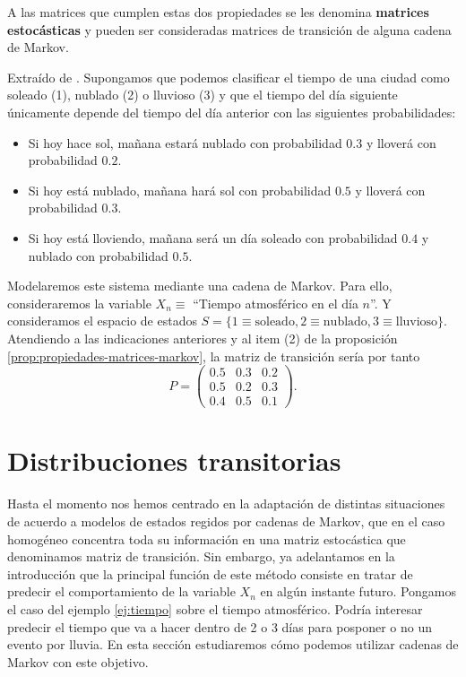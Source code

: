 A las matrices que cumplen estas dos propiedades se les denomina \textbf{matrices estocásticas} y pueden ser consideradas matrices de transición de alguna cadena de Markov.

\begin{ejemplo}
    \label{ej:tiempo}
    Extraído de \cite[Ch. 2, Example 2.3]{kulkarni-2012}. Supongamos que podemos clasificar el tiempo de una ciudad como soleado (1), nublado (2) o lluvioso (3) y que el tiempo del día siguiente únicamente depende del tiempo del día anterior con las siguientes probabilidades:
    \begin{itemize}
        \item Si hoy hace sol, mañana estará nublado con probabilidad $0.3$ y lloverá con probabilidad $0.2$.
        \item Si hoy está nublado, mañana hará sol con probabilidad $0.5$ y lloverá con probabilidad $0.3$.
        \item Si hoy está lloviendo, mañana será un día soleado con probabilidad $0.4$ y nublado con probabilidad $0.5$.
    \end{itemize}

    Modelaremos este sistema mediante una cadena de Markov. Para ello, consideraremos la variable $X_n \equiv$ ``Tiempo atmosférico en el día $n$''. Y consideramos el espacio de estados $S = \{ 1\equiv\text{soleado}, 2\equiv\text{nublado}, 3\equiv\text{lluvioso}\}$. Atendiendo a las indicaciones anteriores y al item (2) de la proposición \ref{prop:propiedades-matrices-markov}, la matriz de transición sería por tanto
    $$ P = \begin{pmatrix}
        0.5 & 0.3 & 0.2 \\
        0.5 & 0.2 & 0.3 \\
        0.4 & 0.5 & 0.1
    \end{pmatrix}.
    $$

\end{ejemplo}

\section{Distribuciones transitorias}

Hasta el momento nos hemos centrado en la adaptación de distintas situaciones de acuerdo a modelos de estados regidos por cadenas de Markov, que en el caso homogéneo concentra toda su información en una matriz estocástica que denominamos matriz de transición. Sin embargo, ya adelantamos en la introducción que la principal función de este método consiste en tratar de predecir el comportamiento de la variable $X_n$ en algún instante futuro. Pongamos el caso del ejemplo \ref{ej:tiempo} sobre el tiempo atmosférico. Podría interesar predecir el tiempo que va a hacer dentro de 2 o 3 días para posponer o no un evento por lluvia. En esta sección estudiaremos cómo podemos utilizar cadenas de Markov con este objetivo.

